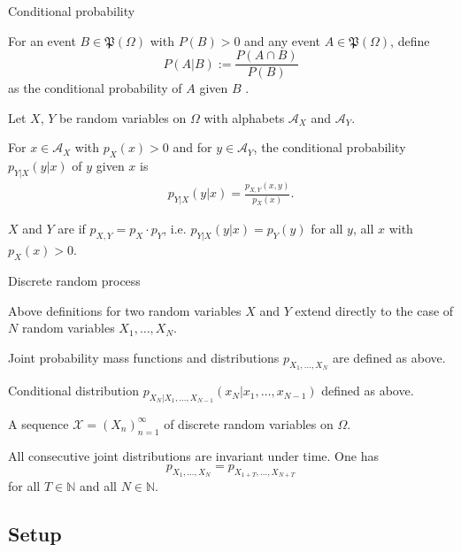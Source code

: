 \begin{frame}{Conditional probability} 
\bit
\item For an event $B\in\mathfrak{P}(\Omega)$ with $P(B)>0$ and any event $A\in\mathfrak{P}(\Omega)$, define 
\[
P(A|B):=\frac{P(A\cap B)}{P(B)}
\]
as the conditional probability of $A$ given $B$ .
\eit
{}
\bit
\item  Let $X$, $Y$ be random variables on $\Omega$ with alphabets $\mathcal{A}_X$ and $\mathcal{A}_Y$. 
\item For $x\in\mathcal{A}_X$ with $p_X(x)>0$ and for $y\in\mathcal{A}_Y$, the conditional probability $p_{Y|X}(y|x)$ of $y$ given $x$ is 
\begin{align*}
p_{Y|X}(y|x)=\frac{p_{X,Y}(x,y)}{p_X(x)}.
\end{align*}
\item $X$ and $Y$ are  if $p_{X,Y}=p_X\cdot p_Y$, i.e. $p_{Y|X}(y|x)=p_Y(y)$ for all $y$, all $x$ with $p_X(x)>0$.
\eit
\end{frame}


\begin{frame}{Discrete random process} 
\bit
\item Above definitions for two random variables $X$ and $Y$ extend directly to the case of $N$ random variables $X_1,\dots,X_N$.
\item Joint probability mass functions and distributions $p_{X_1,\dots,X_N}$ are defined as above.
\item Conditional distribution $p_{X_N|X_1,\dots,X_{N-1}}(x_N|x_1,\dots,x_{N-1})$ defined as above. 
\eit
{}
\bit
\item A sequence $\mathcal{X}=(X_n)_{n=1}^\infty$ of discrete random variables on $\Omega$.
\eit
{}
\bit
\item All consecutive joint distributions are invariant under time. One has
\[
p_{X_1,\dots,X_N}=p_{X_{1+T},\dots,X_{N+T}}
\]
for all $T\in\mathbb{N}$ and all $N\in\mathbb{N}$. 
\eit
\end{frame}


\subsection{Setup}


